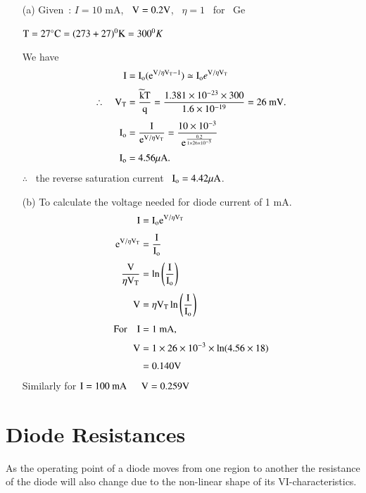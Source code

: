 \begin{solution}
\begin{itemize}
\item[(a)] Given~: $I=10\text{~mA}$, \ $\textrm{V}=0.2\textrm{V}$, \ $\eta=1$ \ for \ Ge

$\textrm{T}=27^{\circ}\textrm{C}=(273+27)^{0}\textrm{K}=300^{0}K$

We have
\begin{align*}
\textrm{I} &= \textrm{I}_{\textrm{o}}(\textrm{e}^{\textrm{V}/\eta \textrm{V}_{\textrm{T}}-1})\simeq \textrm{I}_{\textrm{o}}e^{\textrm{V}/\eta \textrm{V}_{\textrm{T}}}\\[3pt]
\therefore\quad \textrm{V}_{\textrm{T}} &= \frac{\widetilde{\textrm{k}}\textrm{T}}{\textrm{q}}=\frac{1.381\times 10^{-23}\times 300}{1.6\times 10^{-19}}=26\text{~mV}.\\[3pt]
\textrm{I}_{\textrm{o}} &= \frac{\textrm{I}}{\textrm{e}^{\textrm{V}/\eta \textrm{V}_{\textrm{T}}}}=\frac{10\times 10^{-3}}{\textrm{e}^{\frac{0.2}{1\times 26\times 10^{-3}}}}\\[3pt]
\textrm{I}_{\textrm{o}} &= 4.56\mu \textrm{A}.
\end{align*}
$\therefore$~ the reverse saturation current~ $\textrm{I}_{\textrm{o}}=4.42\mu\textrm{A}$.

\item[(b)] To calculate the voltage needed for diode current of 1 mA.
\begin{align*}
\textrm{I} &= \textrm{I}_{\textrm{o}}\textrm{e}^{\textrm{V}/\eta \textrm{V}_{\textrm{T}}}\\[3pt]
\textrm{e}^{\textrm{V}/\eta \textrm{V}_{\textrm{T}}} &= \frac{\textrm{I}}{\textrm{I}_{\textrm{o}}}\\[3pt]
\frac{\textrm{V}}{\eta \textrm{V}_{\textrm{T}}} &= \ln \left(\frac{\textrm{I}}{\textrm{I}_{\textrm{o}}}\right)\\[3pt]
\textrm{V} &= \eta \textrm{V}_{\textrm{T}}\ln \left(\frac{\textrm{I}}{\textrm{I}_{\textrm{o}}}\right)\\[3pt]
\text{For}\quad \textrm{I} &= 1\text{~mA},\\[3pt]
\textrm{V} &= 1\times 26\times 10^{-3}\times \ln (4.56\times 18)\\[3pt]
&= 0.140\textrm{V}
\end{align*}
Similarly for $\textrm{I}=100\text{~mA}$ \ \ $\textrm{V}=0.259\textrm{V}$
\end{itemize}
\end{solution}

\section{Diode Resistances}\label{sec2.8}

As the operating point of a diode moves from one region to another the resistance of the diode will also change due to the non-linear shape of its VI-characteristics.

